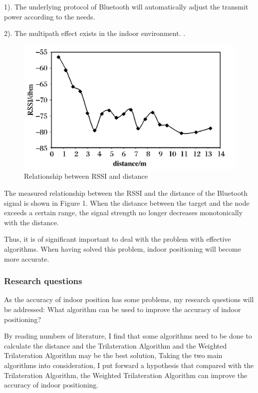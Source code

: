 \documentclass{sigchi}
\begin{document}
1). The underlying protocol of Bluetooth will automatically adjust the transmit power according to the needs.

2). The multipath effect exists in the indoor environment. \cite{liu2007survey}.

\begin{figure}[!h]
\centering
\includegraphics[width=1\columnwidth]{3.png}
\caption{Relationship between RSSI and distance}
\label{fig:universe}
\end{figure}


The measured relationship between the RSSI and the distance of the Bluetooth signal is shown in Figure 1. When the distance between the target and the node exceeds a certain range, the signal strength no longer decreases monotonically with the distance.

Thus, it is of significant important to deal with the problem with effective algorithms. When having solved this problem, indoor positioning will become more accurate.

\subsubsection{Research questions}

As the accuracy of indoor position has some problems, my research questions will be addressed: What algorithm can be used to improve the accuracy of indoor positioning?

By reading numbers of literature, I find that some algorithms need to be done to calculate the distance and the Trilateration Algorithm and the Weighted Trilateration Algorithm may be the best solution, Taking the two main algorithms into consideration, I put forward a hypothesis that compared with the Trilateration Algorithm, the Weighted Trilateration Algorithm can improve the accuracy of indoor positioning.
\end{document}
